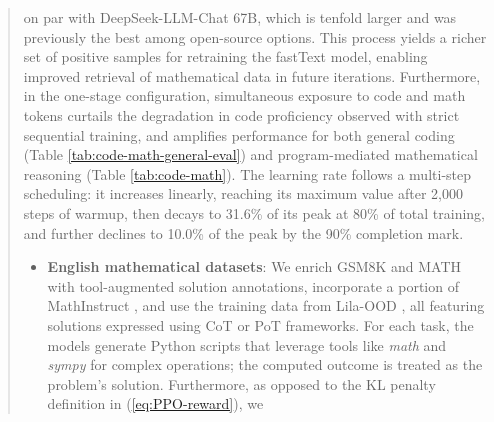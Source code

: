 \begin{itemize}[topsep=0pt]
\begin{itemize}[topsep=0pt]
\begin{itemize}[topsep=0pt]
\begin{abstract}
\begin{itemize}[topsep=0pt]
on par with DeepSeek-LLM-Chat 67B, which is tenfold larger and was previously the best among open-source options. This process yields a richer set of positive samples for retraining the fastText model, enabling improved retrieval of mathematical data in future iterations. Furthermore, in the one-stage configuration, simultaneous exposure to code and math tokens curtails the degradation in code proficiency observed with strict sequential training, and amplifies performance for both general coding (Table \ref{tab:code-math-general-eval}) and program-mediated mathematical reasoning (Table \ref{tab:code-math}). The learning rate follows a multi-step scheduling: it increases linearly, reaching its maximum value after 2,000 steps of warmup, then decays to 31.6\% of its peak at 80\% of total training, and further declines to 10.0\% of the peak by the 90\% completion mark. \begin{itemize}[topsep=0pt]
    \item \textbf{English mathematical datasets}: We enrich GSM8K and MATH with tool-augmented solution annotations, incorporate a portion of MathInstruct \citep{MathInstruct}, and use the training data from Lila-OOD \citep{lila}, all featuring solutions expressed using CoT or PoT frameworks. For each task, the models generate Python scripts that leverage tools like \textit{math} and \textit{sympy} for complex operations; the computed outcome is treated as the problem’s solution. Furthermore, as opposed to the KL penalty definition in (\ref{eq:PPO-reward}), we


\end{itemize}
\end{itemize}
\end{abstract}
\end{itemize}
\end{itemize}
\end{itemize}
